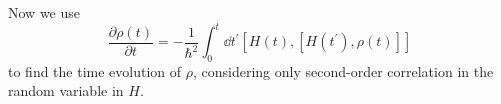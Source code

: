 \documentclass[hyperref, a4paper]{article}
\begin{document}
Now we use 
\begin{equation}
    \frac{\partial \rho(t)}{\partial t}=-\frac{1}{\hbar^2} \int_0^t \dd t^{\prime}\left[H(t),\left[H\left(t^{\prime}\right), \rho(t)\right]\right]
\end{equation}
to find the time evolution of $\rho$, 
considering only second-order correlation 
in the random variable in $H$.
\end{document}
